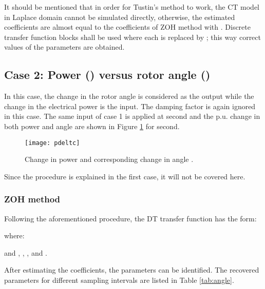 \documentclass[10pt,journal,final]{IEEEtran}
\begin{document}
It should be mentioned that in order for Tustin's method to work, the CT model in Laplace domain cannot be simulated directly, otherwise, the estimated coefficients are almost equal to the coefficients of ZOH method with . Discrete transfer function blocks shall be used where each  is replaced by ; this way correct values of the parameters are obtained.
\subsection{Case 2: Power () versus rotor angle ()}
In this case, the change in the rotor angle  is considered as the output while the change in the electrical power  is the input. The damping factor is again {ignored} in this case. The same input of case 1 is applied at  second and the p.u. change in both power and angle are shown in Figure \ref{fig:pangle} for  second.
\begin{figure}[h!]
\centering
\texttt{[image: pdeltc]}
\caption{Change in power  and corresponding change in angle .}
\label{fig:pangle}
\end{figure}
Since the procedure is explained in the first case, it will not be covered here.
\subsubsection{ZOH method}
Following the aforementioned procedure, the DT transfer function has the form:

where:

and , , , and .

After estimating the coefficients, the parameters can be identified. The recovered parameters for different sampling intervals are listed in Table \ref{tab:angle}.
\end{document}
